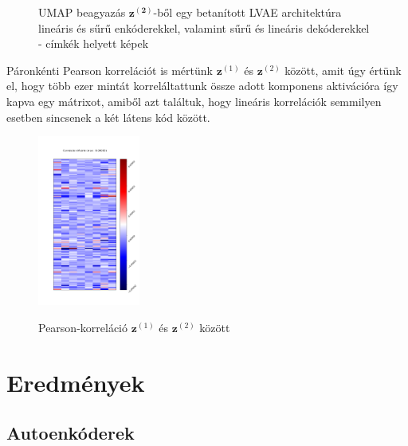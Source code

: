 \documentclass[12pt, english]{article}
\begin{document}
\begin{figure}[H]
\begin{minipage}{0.48\linewidth}
    \caption{UMAP beagyazás $\bm{z^{(2)}}$-ből egy betanított LVAE architektúra lineáris és sűrű enkóderekkel, valamint sűrű és lineáris dekóderekkel - címkék helyett képek} 
    \label{fig:umap-z2-text}
  \end{minipage} 
\end{figure}

\vspace{4mm}

\par Páronkénti Pearson korrelációt is mértünk $\bm{z}^{(1)}$ és $\bm{z}^{(2)}$ között, amit úgy értünk el, hogy több ezer mintát korreláltattunk össze adott komponens aktivációra így kapva egy mátrixot, amiből azt találtuk, hogy lineáris korrelációk semmilyen esetben sincsenek a két látens kód között.

\vspace{4mm}

\begin{figure}[H]
    \centering
    \includegraphics[width=0.3\textwidth]{z1_z2_correlation.png}
    \label{fig:pearson-matrix}
    \caption{Pearson-korreláció $\bm{z}^{(1)}$ és $\bm{z}^{(2)}$ között}
\end{figure}

\newpage

\section{Eredmények}

\vspace{7mm}

\subsection{Autoenkóderek}

\vspace{5mm}
\end{document}
